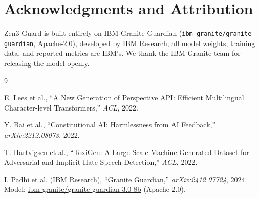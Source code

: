 \documentclass[11pt,a4paper]{article}
\begin{document}
\section*{Acknowledgments and Attribution}

Zen3-Guard is built entirely on IBM Granite Guardian (\texttt{ibm-granite/granite-guardian},
Apache-2.0), developed by IBM Research; all model weights, training data, and reported
metrics are IBM's. We thank the IBM Granite team for releasing the model openly.


\begin{thebibliography}{9}

E. Lees et al.,
``A New Generation of Perspective API: Efficient Multilingual Character-level Transformers,''
\textit{ACL}, 2022.

Y. Bai et al.,
``Constitutional AI: Harmlessness from AI Feedback,''
\textit{arXiv:2212.08073}, 2022.

T. Hartvigsen et al.,
``ToxiGen: A Large-Scale Machine-Generated Dataset for Adversarial and Implicit Hate Speech Detection,''
\textit{ACL}, 2022.

I. Padhi et al. (IBM Research),
``Granite Guardian,''
\textit{arXiv:2412.07724}, 2024.
Model: \href{https://huggingface.co/ibm-granite/granite-guardian-3.0-8b}{ibm-granite/granite-guardian-3.0-8b} (Apache-2.0).

\end{thebibliography}
\end{document}
